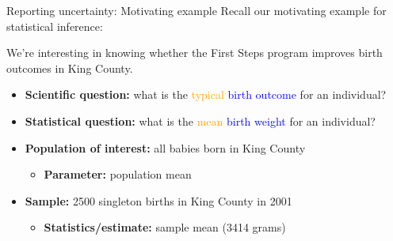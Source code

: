 \documentclass[10pt,t]{beamer}
\begin{document}
\begin{frame}{Reporting uncertainty: Motivating example}
Recall our motivating example for statistical inference:

\vspace{0.3cm}

We're interesting in knowing whether the First Steps program improves birth outcomes in King County.

\vspace{0.1cm}

\begin{itemize}
	\item \textbf{Scientific question:} what is the \textcolor{orange}{typical}  \textcolor{blue}{birth outcome} for an individual?
	\item \textbf{Statistical question:} what is the \textcolor{orange}{mean} \textcolor{blue}{birth weight} for an individual?
	\item \textbf{Population of interest:} all babies born in King County
	\begin{itemize}
		\item \textbf{Parameter:} population mean
	\end{itemize}
	\item \textbf{Sample:} 2500 singleton births in King County in 2001
	\begin{itemize}
		\item \textbf{Statistics/estimate:} sample mean (3414 grams)
	\end{itemize}
\end{itemize}

\end{frame}
\end{document}
